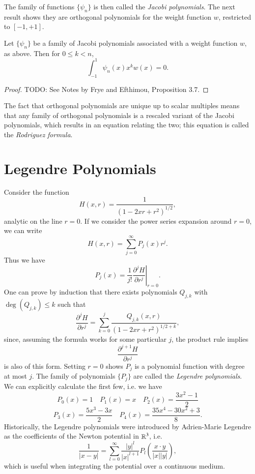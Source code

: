The family of functions $\{ \psi_n \}$ is then called the \emph{Jacobi polynomials}. The next result shows they are orthogonal polynomials for the weight function $w$, restricted to $[-1,+1]$.

\begin{theorem}
    Let $\{ \psi_n \}$ be a family of Jacobi polynomials associated with a weight function $w$, as above. Then for $0 \leq k < n$,
    \[ \int_{-1}^1 \psi_n(x) x^k w(x) = 0. \]
\end{theorem}
\begin{proof}
    TODO: See Notes by Frye and Efthimou, Proposition 3.7.
\end{proof}

The fact that orthogonal polynomials are unique up to scalar multiples means that any family of orthogonal polynomials is a rescaled variant of the Jacobi polynomials, which results in an equation relating the two; this equation is called the \emph{Rodriguez formula}.



\newpage







\section{Legendre Polynomials}

Consider the function
%
\[ H(x,r) = \frac{1}{(1 - 2xr + r^2)^{1/2}}, \]
%
analytic on the line $r = 0$. If we consider the power series expansion around $r = 0$, we can write
%
\[ H(x,r) = \sum_{j = 0}^\infty P_j(x) r^j. \]
%
Thus we have
%
\[ P_j(x) = \left. \frac{1}{j!} \frac{\partial^j H}{\partial r^j} \right|_{r = 0}. \]
%
One can prove by induction that there exists polynomials $Q_{j,k}$ with $\deg(Q_{j,k}) \leq k$ such that
%
\[ \frac{\partial^j H}{\partial r^j} = \sum_{k = 0}^j \frac{Q_{j,k}(x,r)}{(1 - 2xr + r^2)^{1/2 + k}}, \]
%
since, assuming the formula works for some particular $j$, the product rule implies
%
\[ \frac{\partial^{j+1} H}{\partial r^j} \]
%
is also of this form. Setting $r = 0$ shows $P_j$ is a polynomial function with degree at most $j$. The family of polynomials $\{ P_j \}$ are called the \emph{Legendre polynomials}. We can explicitly calculate the first few, i.e. we have
%
\[  P_0(x) = 1 \quad P_1(x) = x \quad P_2(x) = \frac{3x^2 - 1}{2} \]
\[ P_3(x) = \frac{5x^3 - 3x}{2} \quad P_4(x) = \frac{35x^4 - 30x^2 + 3}{8}. \]
%
Historically, the Legendre polynomials were introduced by Adrien-Marie Legendre as the coefficients of the Newton potential in $\operatorname{\mathbb{R}}^3$, i.e.
%
\[ \frac{1}{|x - y|} = \sum_{l = 0}^\infty \frac{|y|^l}{|x|^{l+1}} P_l \left( \frac{x \cdot y}{|x| |y|} \right), \]
%
which is useful when integrating the potential over a continuous medium.


